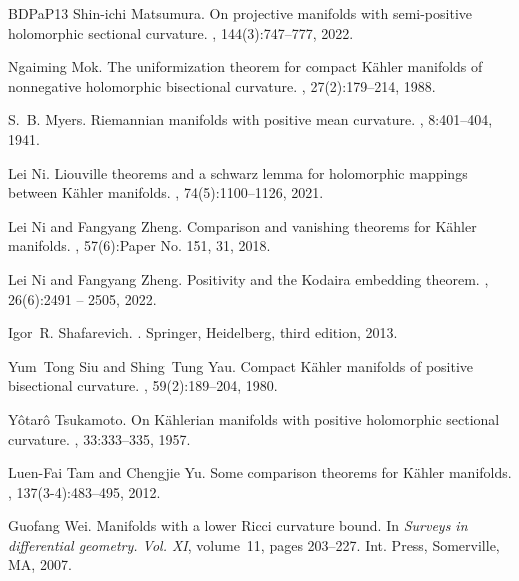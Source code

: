 \documentclass[12pt]{amsart}
\theoremstyle{plain}
\theoremstyle{definition}
\renewcommand{\>}{\rightarrow}
\numberwithin{equation}{section} %
\begin{document}
\begin{thebibliography}{BDPaP13}
		Shin-ichi Matsumura.
		\newblock On projective manifolds with semi-positive holomorphic sectional curvature.
		, 144(3):747--777, 2022.

		Ngaiming Mok.
		\newblock The uniformization theorem for compact {K}\"ahler manifolds of nonnegative holomorphic bisectional curvature.
		, 27(2):179--214, 1988.
		
		S.~B. Myers.
		\newblock Riemannian manifolds with positive mean curvature.
		, 8:401--404, 1941.
		
		Lei Ni.
		\newblock Liouville theorems and a schwarz lemma for holomorphic mappings between {K}\"ahler manifolds.
		, 74(5):1100--1126, 2021.

		Lei Ni and Fangyang Zheng.
		\newblock Comparison and vanishing theorems for {K}\"ahler manifolds.
		, 57(6):Paper No. 151, 31, 2018.
		
		Lei Ni and Fangyang Zheng.
		\newblock Positivity and the {K}odaira embedding theorem.
		, 26(6):2491 -- 2505, 2022.

		Igor~R. Shafarevich.
		.
		\newblock Springer, Heidelberg, third edition, 2013.
		
		Yum~Tong Siu and Shing~Tung Yau.
		\newblock Compact {K}\"ahler manifolds of positive bisectional curvature.
		, 59(2):189--204, 1980.
		
		Y\^otar\^o Tsukamoto.
		\newblock On {K}\"ahlerian manifolds with positive holomorphic sectional curvature.
		, 33:333--335, 1957.
		
		Luen-Fai Tam and Chengjie Yu.
		\newblock Some comparison theorems for {K}\"ahler manifolds.
		, 137(3-4):483--495, 2012.
		
		Guofang Wei.
		\newblock Manifolds with a lower {R}icci curvature bound.
		\newblock In {\em Surveys in differential geometry. {V}ol. {XI}}, volume~11, pages 203--227. Int. Press, Somerville, MA, 2007.
		

\end{thebibliography}
\end{document}
